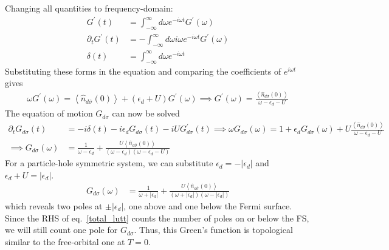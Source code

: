 \documentclass{report}
\numberwithin{equation}{section}
\begin{document}
Changing all quantities to frequency-domain:
\begin{equation}\begin{aligned}
	G^\prime(t) &= \int_{-\infty}^\infty d\omega e^{-i\omega t} G^\prime(\omega)\\
	\partial_t G^\prime(t) &= -\int_{-\infty}^\infty d\omega i \omega e^{-i\omega t} G^\prime(\omega)\\
	\delta(t) &= \int_{-\infty}^\infty d\omega e^{-i\omega t}
\end{aligned}\end{equation}
Substituting these forms in the equation and comparing the coefficients of \(e^{i\omega t}\) gives
\begin{equation}\begin{aligned}
	 \omega G^\prime(\omega) =  \left< \hat n_{d\overline\sigma}(0)\right> + \left( \epsilon_d + U \right) G^\prime(\omega)\implies G^\prime(\omega) = \frac{\left< \hat n_{d\overline\sigma}(0)\right>}{\omega - \epsilon_d - U}
\end{aligned}\end{equation}
The equation of motion \(G_{d\sigma}\) can now be solved
\begin{equation}\begin{aligned}
	\partial_t G_{d\sigma}(t) &= -i \delta(t) - i\epsilon_d G_{d\sigma}(t) - iU G^\prime_{d\sigma}(t) \implies \omega G_{d\sigma}(\omega) = 1 + \epsilon_d G_{d\sigma}(\omega) + U\frac{\left< \hat n_{d\overline\sigma}(0)\right>}{\omega - \epsilon_d - U}\\
	\implies G_{d\sigma}(\omega) &= \frac{1}{\omega - \epsilon_d} + \frac{U\left< \hat n_{d\overline\sigma}(0)\right>}{\left( \omega - \epsilon_d \right) \left(\omega - \epsilon_d - U\right)}
\end{aligned}\end{equation}
For a particle-hole symmetric system, we can substitute \(\epsilon_d = -|\epsilon_d|\) and \(\epsilon_d + U = |\epsilon_d|\).
\begin{equation}\begin{aligned}
	G_{d\sigma}(\omega) &= \frac{1}{\omega + |\epsilon_d|} + \frac{U\left< \hat n_{d\overline\sigma}(0)\right>}{\left( \omega + |\epsilon_d| \right) \left(\omega - |\epsilon_d|\right)}
\end{aligned}\end{equation}
which reveals two poles at \(\pm |\epsilon_d|\), one above and one below the Fermi surface. Since the RHS of eq.~\eqref{total_lutt} counts the number of poles on or below the FS, we will still count one pole for \(G_{d\sigma}\). Thus, this Green's function is topological similar to the free-orbital one at \(T=0\).
\end{document}
